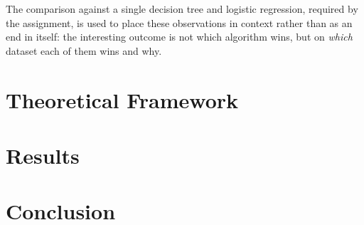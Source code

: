 \documentclass[a4paper, 10pt]{article}
\begin{document}
The comparison against a single decision tree and logistic regression, required by the assignment, is used to place these observations in context rather than as an end in itself: the interesting outcome is not which algorithm wins, but on \emph{which} dataset each of them wins and why.

\section{Theoretical Framework}\label{sec:theory}


\section{Results}
\label{sec:results}

\section{Conclusion}

\printbibliography
\end{document}
